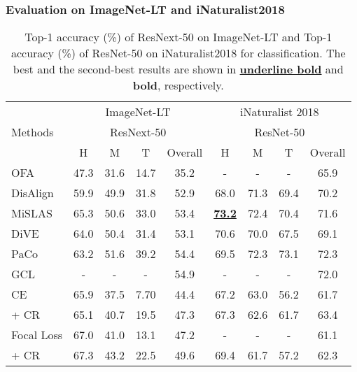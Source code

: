 \documentclass[10pt,twocolumn,letterpaper]{article}
\begin{document}
\subsubsection{Evaluation on ImageNet-LT and iNaturalist2018}

\begin{table}[t]
\caption{Top-1 accuracy (\%) of ResNext-50 \cite{paper20} on ImageNet-LT and Top-1 accuracy (\%) of ResNet-50 \cite{paper21} on iNaturalist2018 for classification. The best and the second-best results are shown in \underline{\textbf{underline bold}} and \textbf{bold}, respectively. }
\label{table2}
\vskip -0.08in
\centering  
\begin{small}
\renewcommand\arraystretch{1}
\setlength{\tabcolsep}{1.1pt} \begin{tabular}{l|cccc| cccc}
\hline \toprule
\multirow{3}{*}{Methods}    & \multicolumn{4}{c|}{ImageNet-LT}  & \multicolumn{4}{c}{iNaturalist 2018}  \\ \cline{2-9}
& \multicolumn{4}{c|}{ResNext-50}  & \multicolumn{4}{c}{ResNet-50}  \\ \cline{2-9}
& H   &M  &T   &Overall   &H   &M   &T   &Overall \\ \hline
OFA \cite{paper10}    &47.3 & 31.6 & 14.7 & 35.2 & \multicolumn{1}{c}{-}  & \multicolumn{1}{c}{-} & \multicolumn{1}{c}{-} & 65.9 \\
DisAlign \cite{paper11}  &59.9 &49.9 &31.8 &52.9 &68.0 &71.3 &69.4 &70.2  \\
MiSLAS \cite{paper1}   &65.3 &50.6 & 33.0 & 53.4 &\underline{\textbf{73.2}}  &72.4 & 70.4 & 71.6 \\ 
DiVE \cite{paper12} &64.0 & 50.4 & 31.4 & 53.1 & 70.6  & 70.0 & 67.5 & 69.1 \\  
PaCo \cite{paper13} &63.2 & 51.6 & 39.2 & 54.4 & 69.5  & 72.3 & 73.1 & 72.3 \\ 
GCL \cite{paper9} &\multicolumn{1}{c}{-}  & \multicolumn{1}{c}{-} & \multicolumn{1}{c}{-} & 54.9 &\multicolumn{1}{c}{-}  & \multicolumn{1}{c}{-} & \multicolumn{1}{c}{-} &72.0  \\ \hline

CE &65.9 & 37.5 & 7.70 & 44.4 & 67.2  & 63.0 & 56.2 & 61.7 \\
\rowcolor{blue!5} + CR &65.1 & 40.7 & 19.5 & 47.3 & 67.3  & 62.6 & 61.7 & 63.4 \\ \hline

Focal Loss \cite{paper3} &67.0 & 41.0 & 13.1 & 47.2 & \multicolumn{1}{c}{-}  & \multicolumn{1}{c}{-} & \multicolumn{1}{c}{-} & 61.1 \\
\rowcolor{blue!5} + CR  &67.3 & 43.2 & 22.5 &49.6 &69.4  &61.7 &57.2 &62.3 \\ \hline


\end{tabular}
\end{small}
\end{table}
\end{document}
